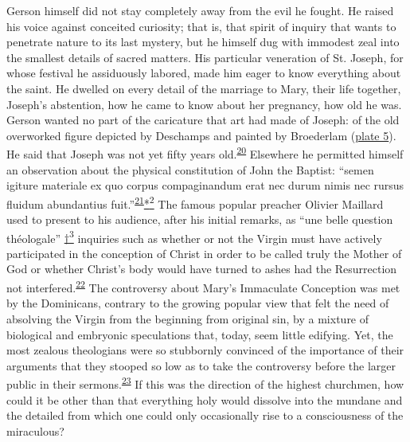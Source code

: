Gerson himself did not stay completely away from the evil he fought. He
raised his voice against conceited curiosity; that is, that spirit of
inquiry that wants to penetrate nature to its last mystery, but he
himself dug with immodest zeal into the smallest details of sacred
matters. His particular veneration of St. Joseph, for whose festival he
assiduously labored, made him eager to know everything about the saint.
He dwelled on every detail of the marriage to Mary, their life together,
Joseph's abstention, how he came to know about her pregnancy, how old he
was. Gerson wanted no part of the caricature that art had made of
Joseph: of the old overworked figure depicted by Deschamps and painted
by Broederlam
(\protect\hyperlink{20_ILLUSTRATIONS_FOLLOW_PAGE.xhtmlux5cux23id_5}{plate
5}). He said that Joseph was not yet fifty years
old.\textsuperscript{\protect\hypertarget{13_Chapter_Six__THE_DEPICTION_OF_TH.xhtmlux5cux23id_1231}{\protect\hyperlink{23_NOTES.xhtmlux5cux23id_1232}{20}}}
Elsewhere he permitted himself an observation about the physical
constitution of John the Baptist: ``semen igiture materiale ex quo
corpus compaginandum erat nec durum nimis nec rursus fluidum abundantius
fuit.''\textsuperscript{\protect\hypertarget{13_Chapter_Six__THE_DEPICTION_OF_TH.xhtmlux5cux23id_1229}{\protect\hyperlink{23_NOTES.xhtmlux5cux23id_1230}{21}}}\protect\hypertarget{13_Chapter_Six__THE_DEPICTION_OF_TH.xhtmlux5cux23id_2991}{\protect\hyperlink{23_NOTES.xhtmlux5cux23id_2992}{*\textsuperscript{2}}}
The famous popular preacher Olivier Maillard used to present to his
audience, after his initial remarks, as ``une belle question
théologale''
\protect\hypertarget{13_Chapter_Six__THE_DEPICTION_OF_TH.xhtmlux5cux23id_2993}{\protect\hyperlink{23_NOTES.xhtmlux5cux23id_2994}{†\textsuperscript{3}}}
inquiries such as whether or not the Virgin must have actively
participated in the conception of Christ in order to be called truly the
Mother of God or whether Christ's body would have turned to ashes had
the Resurrection not
\protect\hypertarget{13_Chapter_Six__THE_DEPICTION_OF_TH.xhtmlux5cux23page_178}{}{}interfered.\textsuperscript{\protect\hypertarget{13_Chapter_Six__THE_DEPICTION_OF_TH.xhtmlux5cux23id_1227}{\protect\hyperlink{23_NOTES.xhtmlux5cux23id_1228}{22}}}
The controversy about Mary's Immaculate Conception was met by the
Dominicans, contrary to the growing popular view that felt the need of
absolving the Virgin from the beginning from original sin, by a mixture
of biological and embryonic speculations that, today, seem little
edifying. Yet, the most zealous theologians were so stubbornly convinced
of the importance of their arguments that they stooped so low as to take
the controversy before the larger public in their
sermons.\textsuperscript{\protect\hypertarget{13_Chapter_Six__THE_DEPICTION_OF_TH.xhtmlux5cux23id_1225}{\protect\hyperlink{23_NOTES.xhtmlux5cux23id_1226}{23}}}
If this was the direction of the highest churchmen, how could it be
other than that everything holy would dissolve into the mundane and the
detailed from which one could only occasionally rise to a consciousness
of the miraculous?

